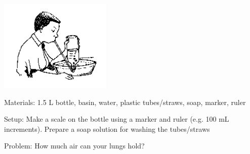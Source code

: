 \begin{center}
\includegraphics[width=0.4\textwidth]{./img/source/lung-capacity.png}
\end{center}

\begin{description*}
\item[Materials:]{1.5 L bottle, basin, water, plastic tubes/straws, soap, marker, ruler}
\item[Setup:]{Make a scale on the bottle using a marker and ruler (e.g. 100 mL increments). Prepare a soap solution for washing the tubes/straws}\\
\item[Problem:]{How much air can your lungs hold?\\

}
\end{description*}

